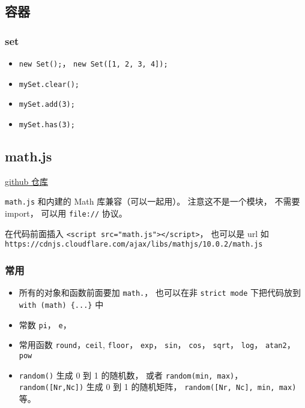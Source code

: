 \subsection{容器}
\subsubsection{set}
\begin{itemize}
\item \verb`new Set();`， \verb`new Set([1, 2, 3, 4]);`
\item \verb`mySet.clear();`
\item \verb`mySet.add(3);`
\item \verb`mySet.has(3);`
\end{itemize}


\subsection{math.js}
\href{https://github.com/josdejong/mathjs}{github 仓库}

\verb|math.js| 和内建的 Math 库兼容（可以一起用）。 注意这不是一个模块， 不需要 import， 可以用 \verb|file://| 协议。

在代码前面插入 \verb|<script src="math.js"></script>|， 也可以是 url 如 \verb|https://cdnjs.cloudflare.com/ajax/libs/mathjs/10.0.2/math.js|

\subsubsection{常用}
\begin{itemize}
\item 所有的对象和函数前面要加 \verb|math.|， 也可以在非 \verb|strict mode| 下把代码放到 \verb|with (math) {...}| 中
\item 常数 \verb|pi|， \verb|e|， 
\item 常用函数 \verb|round|，\verb|ceil|, \verb|floor|， \verb|exp|， \verb|sin|， \verb|cos|， \verb|sqrt|， \verb|log|， \verb|atan2|， \verb|pow|
\item \verb|random()| 生成 0 到 1 的随机数， 或者 \verb|random(min, max)|， \verb|random([Nr,Nc])| 生成 0 到 1 的随机矩阵， \verb|random([Nr, Nc], min, max)| 等。
\end{itemize}

